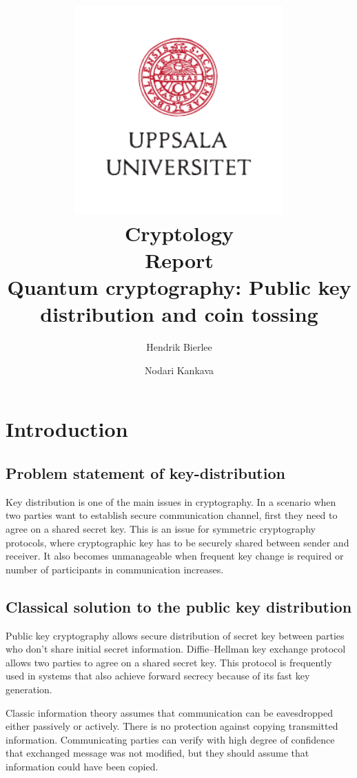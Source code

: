 \documentclass[oneside,a4paper]{article}
\title {
	\includegraphics[width=0.6\textwidth]{UU_logo.pdf}\\[1em]
	Cryptology \\
	Report\\[1em]
	Quantum cryptography: Public key distribution and coin tossing
}
\author{
		Hendrik Bierlee \and
		Nodari Kankava
}
\begin{document}
\maketitle
\thispagestyle{empty} %
\pagebreak

\setcounter{qcounter}{1}
\newcommand{\question}[1]{\par\vspace{10px}\noindent\textbf{Question \theqcounter \stepcounter{qcounter}:} \emph{#1}\vspace{0.5em}\\\noindent}


\section{Introduction}


\subsection{Problem statement of key-distribution}
Key distribution is one of the main issues in cryptography. In a scenario when two parties want to establish secure communication channel, first they need to agree on a shared secret key. This is an issue for symmetric cryptography protocols, where cryptographic key has to be securely shared between sender and receiver. It also becomes unmanageable when frequent key change is required or number of participants in communication increases.

\subsection{Classical solution to the public key distribution}
Public key cryptography allows secure distribution of secret key between parties who don't share initial secret information. Diffie–Hellman key exchange protocol~\cite{diffie1976new} allows two parties to agree on a shared secret key. This protocol is frequently used in systems that also achieve forward secrecy because of its fast key generation.


Classic information theory assumes that communication can be eavesdropped either passively or actively. There is no protection against copying transmitted information. Communicating parties can verify with high degree of confidence that exchanged message was not modified, but they should assume that information could have been copied. 
\end{document}
